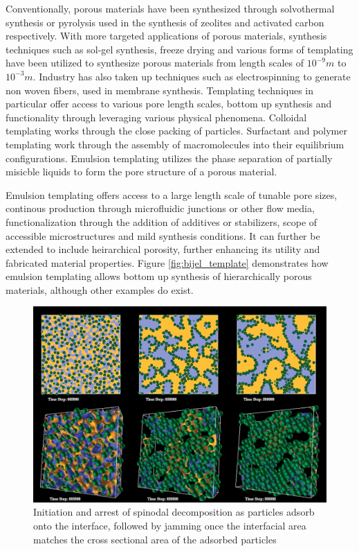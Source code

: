Conventionally, porous materials have been synthesized through solvothermal synthesis or pyrolysis used in the synthesis of zeolites and activated carbon respectively. With more targeted applications of porous materials, synthesis techniques such as sol-gel synthesis, freeze drying and various forms of templating have been utilized to synthesize porous materials from length scales of $10^{-9}m$ to $10^{-3}m$. \cite{stein_morphological_2008, ray_comprehensive_2016, cervellere_mesoscopic_2019, garcia-bennett_unique_2020, zhang_emulsion_2019, alves-rosa_design_2013} Industry has also taken up techniques such as electrospinning to generate non woven fibers, used in membrane synthesis. Templating techniques in particular offer access to various pore length scales, bottom up synthesis and functionality through leveraging various physical phenomena. Colloidal templating works through the close packing of particles. Surfactant and polymer templating work through the assembly of macromolecules into their equilibrium configurations. Emulsion templating utilizes the phase separation of partially misicble liquids to form the pore structure of a porous material. 

Emulsion templating offers access to a large length scale of tunable pore sizes, continous production through microfluidic junctions or other flow media, functionalization through the addition of additives or stabilizers, scope of accessible microstructures and mild synthesis conditions. It can further be extended to include heirarchical porosity, further enhancing its utility and fabricated material properties. \cite{yang_hierarchically_2017, thompson_hierarchically_2019, wang_morphology_2023} Figure \ref{fig:bijel_template} demonstrates how emulsion templating allows bottom up synthesis of hierarchically porous materials, although other examples do exist. \cite{garcia_scalable_2019, santiago_cordoba_aerobijels_2020, thorson_bijel-templated_2019, lu_controllable_2020, wang_morphology_2023}

\begin{figure}
    \centering
    \includegraphics[scale = 0.3]{figures/introduction/bijel_coarsening.jpg}
    \caption{Initiation and arrest of spinodal decomposition as particles adsorb onto the interface, followed by jamming once the interfacial area matches the cross sectional area of the adsorbed particles\cite{stratford_colloidal_2005}}
    \label{fig:bijel_coarsen}
\end{figure}

